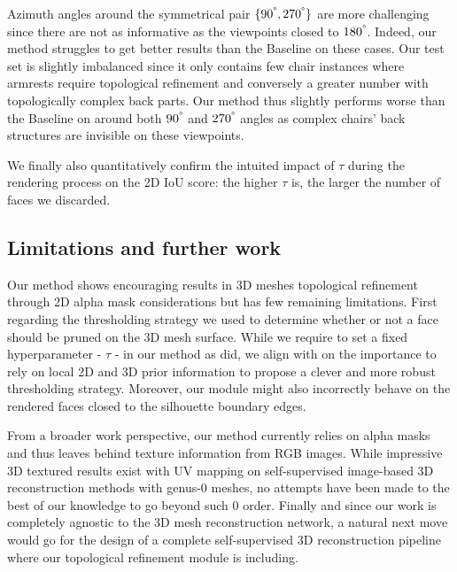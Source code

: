 Azimuth angles around the symmetrical pair $\{90^{\degree}, 270^{\degree}\}$ are more challenging since there are not as informative as the viewpoints closed to $180^{\degree}$. Indeed, our method struggles to get better results than the Baseline on these cases. Our test set is slightly imbalanced since it only contains few chair instances where armrests require topological refinement and conversely a greater number with topologically complex back parts. Our method thus slightly performs worse than the Baseline on around both $90^{\degree}$ and $270^{\degree}$ angles as complex chairs' back structures are invisible on these viewpoints. 

We finally also quantitatively confirm the intuited impact of $\tau$ during the rendering process on the 2D IoU score: the higher $\tau$ is, the larger the number of faces we discarded. 


\subsection{Limitations and further work}

Our method shows encouraging results in 3D meshes topological refinement through 2D alpha mask considerations but has few remaining limitations. First regarding the thresholding strategy we used to determine whether or not a face should be pruned on the 3D mesh surface. While we require to set a fixed hyperparameter - $\tau$ - in our method as \citep{pan2019deep} did, we align with \citep{nie2020total3dunderstanding} on the importance to rely on local 2D and 3D prior information to propose a clever and more robust thresholding strategy. Moreover, our module might also incorrectly behave on the rendered faces closed to the silhouette boundary edges. 

From a broader work perspective, our method currently relies on alpha masks and thus leaves behind texture information from RGB images. While impressive 3D textured results exist with UV mapping on self-supervised image-based 3D reconstruction methods with genus-0 meshes\citep{li2020self,pavllo2020convolutional}, no attempts have been made to the best of our knowledge to go beyond such 0 order. Finally and since our work is completely agnostic to the 3D mesh reconstruction network, a natural next move would go for the design of a complete self-supervised 3D reconstruction pipeline where our topological refinement module is including. 

